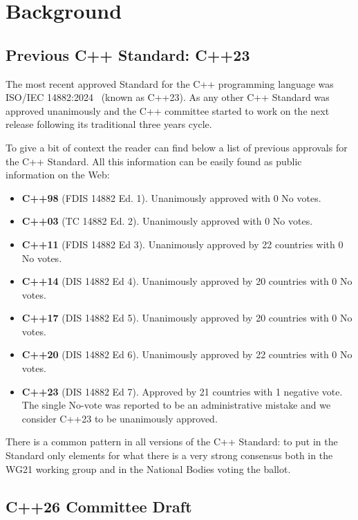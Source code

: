 \section{Background}

\subsection{Previous C++ Standard: C++23}

The most recent approved Standard for the C++ programming language was ISO/IEC
14882:2024~\cite{cpp24} (known as C++23). As any other C++ Standard was approved
unanimously and the C++ committee started to work on the next release following
its traditional three years cycle.

To give a bit of context the reader can find below a list of previous approvals
for the C++ Standard. All this information can be easily found as public
information on the Web:

\begin{itemize}
  \item \textbf{C++98} (FDIS 14882 Ed. 1). Unanimously approved with 0 No votes.
  \item \textbf{C++03} (TC 14882 Ed. 2). 
        Unanimously approved with 0 No votes.
  \item \textbf{C++11} (FDIS 14882 Ed 3). 
        Unanimously approved by 22 countries with 0 No votes.
  \item \textbf{C++14} (DIS 14882 Ed 4).
        Unanimously approved by 20 countries with 0 No votes.
  \item \textbf{C++17} (DIS 14882 Ed 5).
        Unanimously approved by 20 countries with 0 No votes.
  \item \textbf{C++20} (DIS 14882 Ed 6).
        Unanimously approved by 22 countries with 0 No votes.
  \item \textbf{C++23} (DIS 14882 Ed 7). Approved by 21 countries with 1
negative vote. The single No-vote was reported to be an administrative mistake
and we consider C++23 to be unanimously approved.
\end{itemize}

There is a common pattern in all versions of the C++ Standard: to put in the
Standard only elements for what there is a very strong consensus both in the
WG21 working group and in the National Bodies voting the ballot.

\subsection{C++26 Committee Draft}

